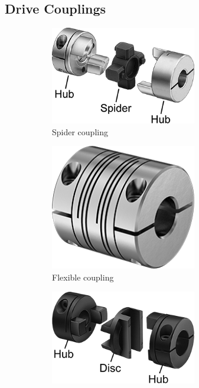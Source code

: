 \documentclass[10pt,letterpaper]{book}
\begin{document}
\subsection{Drive Couplings}
	\begin{figure}[H]	
		\begin{subfigure}[b]{.24\linewidth}
			\includegraphics[width=0.7\textwidth]{imgs/coupling_spider.png}
			\caption{Spider coupling}
		\end{subfigure}
		\begin{subfigure}[b]{.24\linewidth}
			\includegraphics[width=0.7\textwidth]{imgs/coupling_flexible.png}
			\caption{Flexible coupling}
		\end{subfigure}
		\begin{subfigure}[b]{.24\linewidth}
			\includegraphics[width=0.7\textwidth]{imgs/coupling_oldham.png}

\end{subfigure}
\end{figure}
\end{document}
